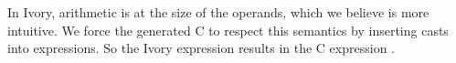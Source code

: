 In Ivory, arithmetic is at the size of the operands, which we believe is more
intuitive.  We force the generated C to respect this semantics by inserting
casts into expressions.  So the Ivory expression  results in the C
expression .















